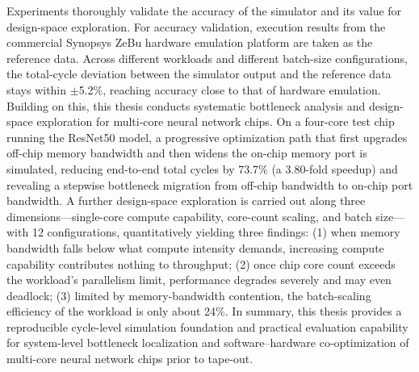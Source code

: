 \begin{englishabstract}
Experiments thoroughly validate the accuracy of the simulator and its value for design-space exploration. For accuracy validation, execution results from the commercial Synopsys ZeBu hardware emulation platform are taken as the reference data. Across different workloads and different batch-size configurations, the total-cycle deviation between the simulator output and the reference data stays within $\pm$5.2\%, reaching accuracy close to that of hardware emulation. Building on this, this thesis conducts systematic bottleneck analysis and design-space exploration for multi-core neural network chips. On a four-core test chip running the ResNet50 model, a progressive optimization path that first upgrades off-chip memory bandwidth and then widens the on-chip memory port is simulated, reducing end-to-end total cycles by 73.7\% (a 3.80-fold speedup) and revealing a stepwise bottleneck migration from off-chip bandwidth to on-chip port bandwidth. A further design-space exploration is carried out along three dimensions---single-core compute capability, core-count scaling, and batch size---with 12 configurations, quantitatively yielding three findings: (1) when memory bandwidth falls below what compute intensity demands, increasing compute capability contributes nothing to throughput; (2) once chip core count exceeds the workload's parallelism limit, performance degrades severely and may even deadlock; (3) limited by memory-bandwidth contention, the batch-scaling efficiency of the workload is only about 24\%. In summary, this thesis provides a reproducible cycle-level simulation foundation and practical evaluation capability for system-level bottleneck localization and software--hardware co-optimization of multi-core neural network chips prior to tape-out.






\end{englishabstract}
